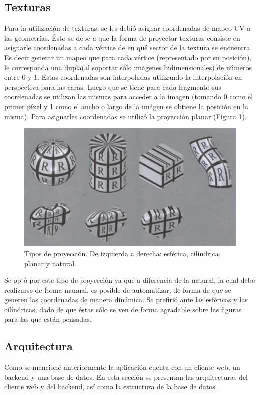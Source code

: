 \documentclass[12pt]{article}
\begin{document}
\subsection{Texturas}
Para la utilización de texturas, se les debió asignar coordenadas de mapeo UV a las geometrías. Ésto se debe a que la forma de proyectar texturas consiste en asignarle coordenadas a cada vértice de en qué sector de la textura se encuentra. Es decir generar un mapeo que para cada vértice (representado por su posición), le corresponda una dupla(al soportar sólo imágenes bidimensionales) de números entre 0 y 1.  Estas coordenadas son interpoladas utilizando la interpolación en perspectiva para las caras\cite{realtimerendering}\cite{engine}. Luego que se tiene para cada fragmento sus coordenadas se utilizan las mismas para acceder a la imagen (tomando 0 como el primer píxel y 1 como el ancho o largo de la imágen se obtiene la posición en la misma). Para asignarles coordenadas se utilizó la proyección planar\cite{realtimerendering} (Figura \ref{texturas}).
\begin{figure}[h!]
\includegraphics[width =0.7\linewidth, center]{proyecciones.png}
\caption{Tipos de proyección. De izquierda a derecha: esférica, cilíndrica, planar y natural.}
\label{texturas}
\end{figure}

Se optó por este tipo de proyección ya que a diferencia de la natural, la cual debe realizarse de forma manual, es posible de automatizar, de forma de que se generen las coordenadas de manera dinámica. Se prefirió ante las esféricas y las cilíndricas, dado de que éstas sólo se ven de forma agradable sobre las figuras para las que están pensadas.

\clearpage
\subsection{Arquitectura}
Como se mencionó anteriormente la aplicación cuenta con un cliente web, un backend y una base de datos. En esta sección se presentan las arquitecturas del cliente web y del backend, así como la estructura de la base de datos.
\end{document}
